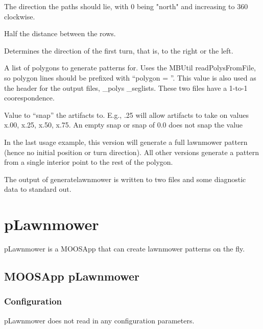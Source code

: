 \begin{hangpar}{\pin}{}
The direction the paths should lie, with 0 being "north" and increasing to 360 clockwise.
\end{hangpar}

\begin{hangpar}{\pin}{}
Half the distance between the rows.
\end{hangpar}

\begin{hangpar}{\pin}{}
Determines the direction of the first turn, that is, to the right or the left.
\end{hangpar}

\begin{hangpar}{\pin}{}
A list of polygons to generate patterns for.  Uses the MBUtil readPolysFromFile, so polygon lines should be prefixed with ``polygon = ''.  This value is also used as the header for the output files, \_polys \_seglists.  These two files have a 1-to-1 coorespondence.
\end{hangpar}

\begin{hangpar}{\pin}{}
Value to ``snap'' the artifacts to.  E.g., .25 will allow artifacts to take on values x.00, x.25, x.50, x.75.  An empty snap or snap of 0.0 does not snap the value
\end{hangpar}

In the last usage example, this version will generate a full lawnmower pattern (hence no initial position or turn direction).  All other versions generate a pattern from a single interior point to the rest of the polygon.

The output of generatelawnmower is written to two files and some diagnostic data to standard out.


\section{pLawnmower}
\label{app:pLawnmower}
pLawnmower is a MOOSApp that can create lawnmower patterns on the fly.

\subsection{MOOSApp pLawnmower}
\label{apppLawnmower}

\subsubsection{Configuration}
pLawnmower does not read in any configuration parameters.

